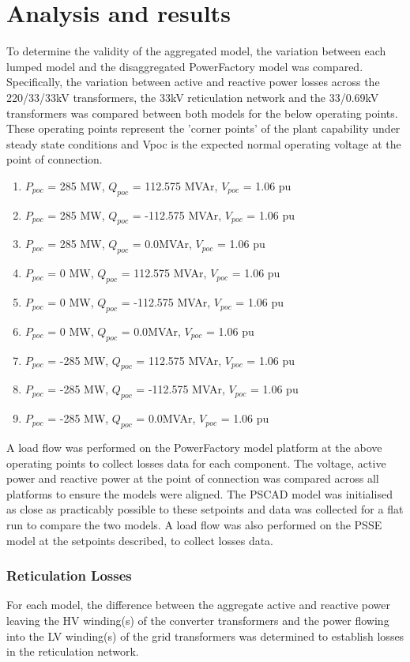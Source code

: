 \documentclass{../grid-link-report}
\begin{document}
	
	\section{Analysis and results}
	
	To determine the validity of the aggregated model, the variation between each lumped model and the disaggregated PowerFactory model was compared. Specifically, the variation between active and reactive power losses across the 220/33/33kV transformers, the 33kV reticulation network and the 33/0.69kV transformers was compared between both models for the below operating points. These operating points represent the 'corner points' of the plant capability under steady state conditions and Vpoc is the expected normal operating voltage at the point of connection.

	\begin{enumerate}
		\item $P_{poc}$ = 285 MW, $Q_{poc}$ = 112.575 MVAr, $V_{poc}$ = 1.06 pu
		\item $P_{poc}$ = 285 MW, $Q_{poc}$ = -112.575 MVAr, $V_{poc}$ = 1.06 pu
		\item $P_{poc}$ = 285 MW, $Q_{poc}$ =  0.0MVAr, $V_{poc}$ = 1.06 pu
		\item $P_{poc}$ = 0 MW, $Q_{poc}$ = 112.575 MVAr, $V_{poc}$ = 1.06 pu
		\item $P_{poc}$ = 0 MW, $Q_{poc}$ = -112.575 MVAr, $V_{poc}$ = 1.06 pu
		\item $P_{poc}$ = 0 MW, $Q_{poc}$ =  0.0MVAr, $V_{poc}$ = 1.06 pu
		\item $P_{poc}$ = -285 MW, $Q_{poc}$ = 112.575 MVAr, $V_{poc}$ = 1.06 pu
		\item $P_{poc}$ = -285 MW, $Q_{poc}$ = -112.575 MVAr, $V_{poc}$ = 1.06 pu
		\item $P_{poc}$ = -285 MW, $Q_{poc}$ =  0.0MVAr, $V_{poc}$ = 1.06 pu
	\end{enumerate}
	
	A load flow was performed on the PowerFactory model platform at the above operating points to collect losses data for each component. The voltage, active power and reactive power at the point of connection was compared across all platforms to ensure the models were aligned. The PSCAD model was initialised as close as practicably possible to these setpoints and data was collected for a flat run to compare the two models. A load flow was also performed on the PSSE model at the setpoints described, to collect losses data.
	
	\subsubsection{Reticulation Losses}
	\label{Reticulation mismatch}
	For each model, the difference between the aggregate active and reactive power leaving the \ac{HV} winding(s) of the converter transformers and the power flowing into the \ac{LV} winding(s) of the grid transformers was determined to establish losses in the reticulation network.
	
\end{document}

